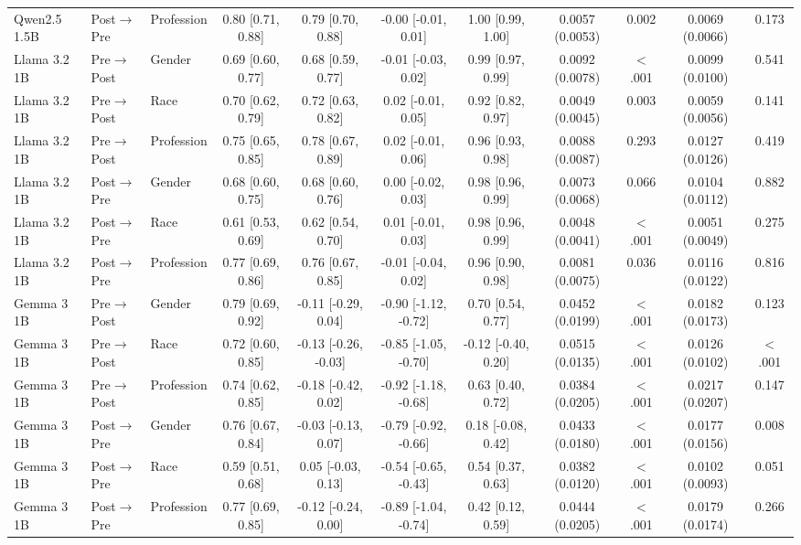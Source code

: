 \begin{tabular}{lllcccccccc}
Qwen2.5 1.5B & Post$\to$Pre & Profession & 0.80 [0.71, 0.88] & 0.79 [0.70, 0.88] & -0.00 [-0.01, 0.01] & 1.00 [0.99, 1.00] & 0.0057 (0.0053) & 0.002 & 0.0069 (0.0066) & 0.173 \\
Llama 3.2 1B & Pre$\to$Post & Gender & 0.69 [0.60, 0.77] & 0.68 [0.59, 0.77] & -0.01 [-0.03, 0.02] & 0.99 [0.97, 0.99] & 0.0092 (0.0078) & $<$.001 & 0.0099 (0.0100) & 0.541 \\
Llama 3.2 1B & Pre$\to$Post & Race & 0.70 [0.62, 0.79] & 0.72 [0.63, 0.82] & 0.02 [-0.01, 0.05] & 0.92 [0.82, 0.97] & 0.0049 (0.0045) & 0.003 & 0.0059 (0.0056) & 0.141 \\
Llama 3.2 1B & Pre$\to$Post & Profession & 0.75 [0.65, 0.85] & 0.78 [0.67, 0.89] & 0.02 [-0.01, 0.06] & 0.96 [0.93, 0.98] & 0.0088 (0.0087) & 0.293 & 0.0127 (0.0126) & 0.419 \\
Llama 3.2 1B & Post$\to$Pre & Gender & 0.68 [0.60, 0.75] & 0.68 [0.60, 0.76] & 0.00 [-0.02, 0.03] & 0.98 [0.96, 0.99] & 0.0073 (0.0068) & 0.066 & 0.0104 (0.0112) & 0.882 \\
Llama 3.2 1B & Post$\to$Pre & Race & 0.61 [0.53, 0.69] & 0.62 [0.54, 0.70] & 0.01 [-0.01, 0.03] & 0.98 [0.96, 0.99] & 0.0048 (0.0041) & $<$.001 & 0.0051 (0.0049) & 0.275 \\
Llama 3.2 1B & Post$\to$Pre & Profession & 0.77 [0.69, 0.86] & 0.76 [0.67, 0.85] & -0.01 [-0.04, 0.02] & 0.96 [0.90, 0.98] & 0.0081 (0.0075) & 0.036 & 0.0116 (0.0122) & 0.816 \\
Gemma 3 1B & Pre$\to$Post & Gender & 0.79 [0.69, 0.92] & -0.11 [-0.29, 0.04] & -0.90 [-1.12, -0.72] & 0.70 [0.54, 0.77] & 0.0452 (0.0199) & $<$.001 & 0.0182 (0.0173) & 0.123 \\
Gemma 3 1B & Pre$\to$Post & Race & 0.72 [0.60, 0.85] & -0.13 [-0.26, -0.03] & -0.85 [-1.05, -0.70] & -0.12 [-0.40, 0.20] & 0.0515 (0.0135) & $<$.001 & 0.0126 (0.0102) & $<$.001 \\
Gemma 3 1B & Pre$\to$Post & Profession & 0.74 [0.62, 0.85] & -0.18 [-0.42, 0.02] & -0.92 [-1.18, -0.68] & 0.63 [0.40, 0.72] & 0.0384 (0.0205) & $<$.001 & 0.0217 (0.0207) & 0.147 \\
Gemma 3 1B & Post$\to$Pre & Gender & 0.76 [0.67, 0.84] & -0.03 [-0.13, 0.07] & -0.79 [-0.92, -0.66] & 0.18 [-0.08, 0.42] & 0.0433 (0.0180) & $<$.001 & 0.0177 (0.0156) & 0.008 \\
Gemma 3 1B & Post$\to$Pre & Race & 0.59 [0.51, 0.68] & 0.05 [-0.03, 0.13] & -0.54 [-0.65, -0.43] & 0.54 [0.37, 0.63] & 0.0382 (0.0120) & $<$.001 & 0.0102 (0.0093) & 0.051 \\
Gemma 3 1B & Post$\to$Pre & Profession & 0.77 [0.69, 0.85] & -0.12 [-0.24, 0.00] & -0.89 [-1.04, -0.74] & 0.42 [0.12, 0.59] & 0.0444 (0.0205) & $<$.001 & 0.0179 (0.0174) & 0.266 \\
\bottomrule
\end{tabular}

